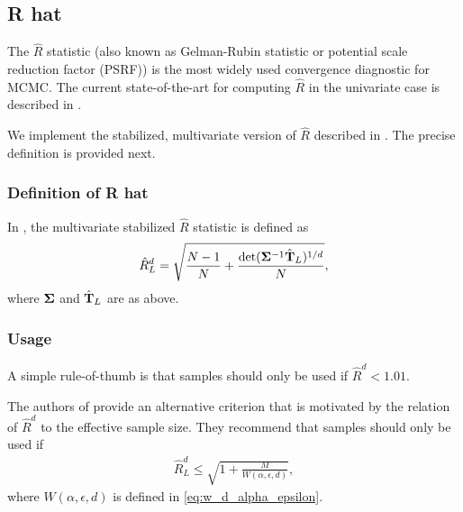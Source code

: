 \documentclass[10pt]{article}
\numberwithin{equation}{section}
\begin{document}
\subsection{R hat}

The $\hat R$ statistic (also known as Gelman-Rubin statistic or  potential scale reduction factor (PSRF)) is the most widely used convergence diagnostic for MCMC. The current state-of-the-art for computing $\hat R$ in the univariate case is described in \cite{VehGelSimCarBur21}.

We implement the stabilized, multivariate version of $\hat R$ described in \cite{VatKnu21}. The precise definition is provided next.

\subsubsection*{Definition of R hat}

In \cite{VatKnu21}, the multivariate stabilized $\hat R$ statistic is defined as
\begin{align*}
\hat R^d_L = \sqrt{ \frac{N-1}{N} + \frac{\det(\mathbf{\Sigma}^{-1} \hat{\mathbf{T}}_L)^{1/d}}{N} },
\end{align*}
where $\mathbf{\Sigma}$ and $\hat{\mathbf{T}}_L$ are as above.


\subsubsection*{Usage}

A simple rule-of-thumb \cite{VehGelSimCarBur21} is that samples should only be used if $\hat R^d < 1.01$.

The authors of \cite{VatKnu21} provide an alternative criterion that is motivated by the relation of $\hat R^d$ to the effective sample size. They recommend that samples should only be used if
\begin{align*}
\hat R^d_L \leq \sqrt{1 + \frac{M}{W(\alpha, \epsilon, d)}},
\end{align*}
where $W(\alpha, \epsilon, d)$ is defined in \eqref{eq:w_d_alpha_epsilon}.







\printbibliography
\end{document}
